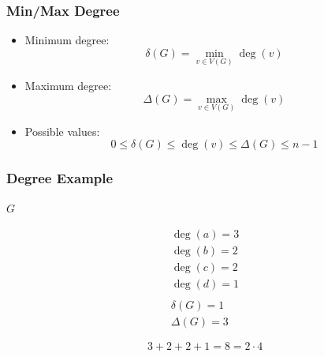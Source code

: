 \documentclass{beamer}
\renewcommand{\d}{\delta}
\newcommand{\D}{\Delta}
\begin{document}
\begin{frame}
  \frametitle{Min/Max Degree}
  \begin{itemize}
  \item Minimum degree:
    \[\d(G)=\min_{v\in V(G)}\deg(v)\]
  \item Maximum degree:
    \[\D(G)=\max_{v\in V(G)}\deg(v)\]
  \item Possible values:
    \[0\le\d(G)\le\deg(v)\le\D(G)\le n-1\]
  \end{itemize}
\end{frame}

\begin{frame}
  \frametitle{Degree Example}
  \begin{center}
    \begin{minipage}{1.5in}
      \centering

      \bigskip

      \(G\)
    \end{minipage}
    \begin{minipage}{2in}
      \begin{gather*}
        \deg(a)=3 \\
        \deg(b)=2 \\
        \deg(c)=2 \\
        \deg(d)=1 \\
        \\
        \d(G)=1 \\
        \D(G)=3
      \end{gather*}
    \end{minipage}

    \[3+2+2+1=8=2\cdot 4\]
  \end{center}
\end{frame}
\end{document}
